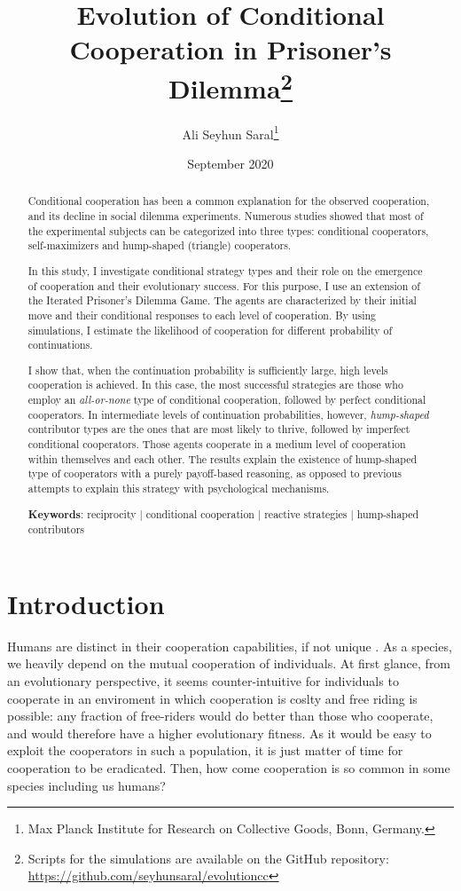 \documentclass[12pt]{article}
\title{Evolution of Conditional Cooperation in Prisoner's Dilemma\footnote{Scripts for the simulations are available on the GitHub repository: \url{https://github.com/seyhunsaral/evolutioncc}}}
\author{Ali Seyhun Saral\thanks{Max Planck Institute for Research on Collective Goods, Bonn, Germany.}}
\date{September 2020}
\begin{document}
\onehalfspacing
\sloppy
\maketitle        
\begin{abstract}

\thispagestyle{plain}

Conditional cooperation has been a common explanation for the observed cooperation, and its decline in social dilemma experiments. Numerous studies showed that most of the experimental subjects can be categorized into three types: conditional cooperators, self-maximizers and hump-shaped (triangle) cooperators. 

In this study, I investigate conditional strategy types and their role on the emergence of cooperation and their evolutionary success. For this purpose, I use an extension of the Iterated Prisoner's Dilemma Game. The agents are characterized by their initial move and their conditional responses to each level of cooperation. By using simulations, I estimate the likelihood of cooperation for different probability of continuations.

I show that, when the continuation probability is sufficiently large, high levels cooperation is achieved. In this case, the most successful strategies are those who employ an \textit{all-or-none} type of conditional cooperation, followed by perfect conditional cooperators. In intermediate levels of continuation probabilities, however, \textit{hump-shaped} contributor types are the ones that are most likely to thrive, followed by imperfect conditional cooperators. Those agents cooperate in a medium level of cooperation within themselves and each other. The results explain the existence of hump-shaped type of cooperators with a purely payoff-based reasoning, as opposed to previous attempts to explain this strategy with psychological mechanisms. 

\textbf{Keywords}: reciprocity | conditional cooperation | reactive strategies | hump-shaped contributors 
\end{abstract}

\section*{Introduction} 
Humans are distinct in their cooperation capabilities, if not unique \citep[See][]{Bowles2011,Wilson2012}. As a species, we heavily depend on the mutual cooperation of individuals. At first glance, from an evolutionary perspective, it seems counter-intuitive for individuals to cooperate in an enviroment in which cooperation is coslty and free riding is possible: any fraction of free-riders would do better than those who cooperate, and would therefore have a higher evolutionary fitness. As it would be easy to exploit the cooperators in such a population, it is just matter of time for cooperation to be eradicated. Then, how come cooperation is so common in some species including us humans?
\end{document}
